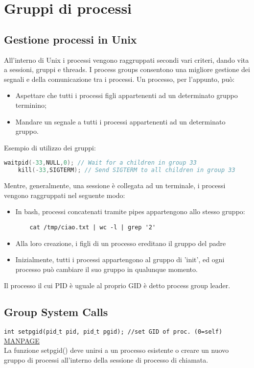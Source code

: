 \section{Gruppi di processi}
\subsection{Gestione processi in Unix}
All'interno di Unix i processi vengono raggruppati secondi vari criteri, dando vita a sessioni, gruppi e threads.
I process groups consentono una migliore gestione dei segnali e della comunicazione tra i processi. Un processo, per l'appunto, può:
\begin{itemize}
    \item Aspettare  che  tutti  i  processi  figli  appartenenti  ad  un determinato  gruppo terminino;
    \item Mandare un segnale a tutti i processi appartenenti ad un determinato gruppo.
\end{itemize}
Esempio di utilizzo dei gruppi:
\begin{lstlisting}[language=C]
    waitpid(-33,NULL,0); // Wait for a children in group 33
    kill(-33,SIGTERM); // Send SIGTERM to all children in group 33
\end{lstlisting}
Mentre, generalmente, una sessione è collegata ad un terminale, i processi vengono raggruppati nel seguente modo:
\begin{itemize}
    \item In bash, processi concatenati tramite pipes appartengono allo stesso gruppo: \begin{verbatim}
    cat /tmp/ciao.txt | wc -l | grep '2'
    \end{verbatim}
    \item Alla loro creazione, i figli di un processo ereditano il gruppo del padre
    \item Inizialmente, tutti i processi appartengono al gruppo di 'init', ed ogni processo può cambiare il suo gruppo in qualunque momento.
\end{itemize} 
Il processo il cui PID è uguale al proprio GID è detto process group leader.

\subsection{Group System Calls}
\texttt{int setpgid(pid$\_$t pid, pid$\_$t pgid); //set GID of proc. (0=self)} \href{https://www.man7.org/linux/man-pages/man3/setpgid.3p.html}{MANPAGE}\\
La funzione setpgid() deve unirsi a un processo esistente
o creare un nuovo gruppo di processi all'interno della sessione di
processo di chiamata.

